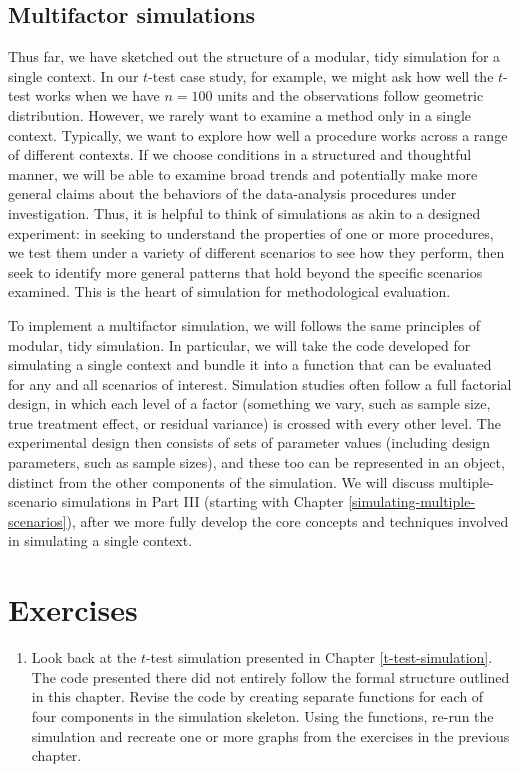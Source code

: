\documentclass[
]{book}
\providecommand{\tightlist}{%
  \setlength{\itemsep}{0pt}\setlength{\parskip}{0pt}}
\begin{document}
\subsection{Multifactor simulations}\label{multifactor-simulations}

Thus far, we have sketched out the structure of a modular, tidy simulation for a single context.
In our \(t\)-test case study, for example, we might ask how well the \(t\)-test works when we have \(n=100\) units and the observations follow geometric distribution.
However, we rarely want to examine a method only in a single context.
Typically, we want to explore how well a procedure works across a range of different contexts.
If we choose conditions in a structured and thoughtful manner, we will be able to examine broad trends and potentially make more general claims about the behaviors of the data-analysis procedures under investigation.
Thus, it is helpful to think of simulations as akin to a designed experiment: in seeking to understand the properties of one or more procedures, we test them under a variety of different scenarios to see how they perform, then seek to identify more general patterns that hold beyond the specific scenarios examined.
This is the heart of simulation for methodological evaluation.

To implement a multifactor simulation, we will follows the same principles of modular, tidy simulation.
In particular, we will take the code developed for simulating a single context and bundle it into a function that can be evaluated for any and all scenarios of interest.
Simulation studies often follow a full factorial design, in which each level of a factor (something we vary, such as sample size, true treatment effect, or residual variance) is crossed with every other level.
The experimental design then consists of sets of parameter values (including design parameters, such as sample sizes), and these too can be represented in an object, distinct from the other components of the simulation.
We will discuss multiple-scenario simulations in Part III (starting with Chapter \ref{simulating-multiple-scenarios}), after we more fully develop the core concepts and techniques involved in simulating a single context.

\section{Exercises}\label{exercises-2}

\begin{enumerate}
\def\labelenumi{\arabic{enumi}.}
\tightlist
\item
  Look back at the \(t\)-test simulation presented in Chapter \ref{t-test-simulation}. The code presented there did not entirely follow the formal structure outlined in this chapter. Revise the code by creating separate functions for each of four components in the simulation skeleton. Using the functions, re-run the simulation and recreate one or more graphs from the exercises in the previous chapter.
\end{enumerate}
\end{document}
